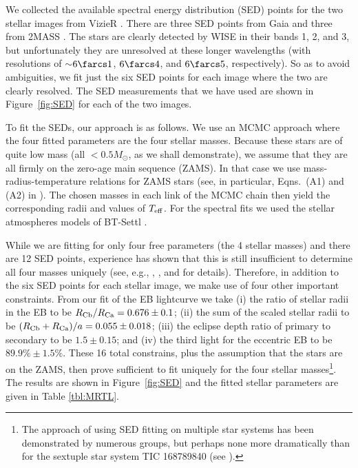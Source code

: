 \documentclass[fleqn,usenatbib]{mnras} %
\begin{document}
We collected the available spectral energy distribution (SED) points for the two stellar images from VizieR \citep[][]{vizier}.  There are three SED points from Gaia \citep[][]{GaiaEDR3} and three from 2MASS \citep[][]{Cutri2003}.  The stars are clearly detected by WISE \citep[][]{Cutri2013} in their bands 1, 2, and 3, but unfortunately they are unresolved at these longer wavelengths (with resolutions of $\sim$$6\farcs1$, $6\farcs4$, and $6\farcs5$, respectively). So as to avoid ambiguities, we fit just the six SED points for each image where the two are clearly resolved. The SED measurements that we have used are shown in Figure~\ref{fig:SED} for each of the two images.

To fit the SEDs, our approach is as follows.  We use an MCMC approach where the four fitted parameters are the four stellar masses.  Because these stars are of quite low mass (all $< 0.5 M_\odot$, as we shall demonstrate), we assume that they are all firmly on the zero-age main sequence (ZAMS).  In that case we use mass-radius-temperature relations for ZAMS stars (see, in particular, Eqns.~(A1) and (A2) in \citealt{Rappaport2017}). The chosen masses in each link of the MCMC chain then yield the corresponding radii and values of $T_{\rm eff}$. For the spectral fits we used the stellar atmospheres models of BT-Settl \citep[][]{Allard2012}.

While we are fitting for only four free parameters (the 4 stellar masses) and there are 12 SED points, experience has shown that this is still insufficient to determine all four masses uniquely (see, e.g., \citealt{Powell2021}, \citealt{borkovits2021}, and \citealt{Kostov2021} for details). Therefore, in addition to the six SED points for each stellar image, we make use of four other important constraints.  From our fit of the EB lightcurve we take (i) the ratio of stellar radii in the EB to be $R_{\rm Cb}/R_{\rm Ca} = 0.676 \pm 0.1$; (ii) the sum of the scaled stellar radii to be  $(R_{\rm Cb}+R_{\rm Ca})/a = 0.055 \pm 0.018$; (iii) the eclipse depth ratio of primary to secondary to be $1.5 \pm 0.15$; and (iv) the third light for the eccentric EB to be $89.9\% \pm 1.5\%$.  These 16 total constrains, plus the assumption that the stars are on the ZAMS, then prove sufficient to fit uniquely for the four stellar masses\footnote{The approach of using SED fitting on multiple star systems has been demonstrated by numerous groups, but perhaps none more dramatically than for the sextuple star system TIC 168789840 (see \citealt{Powell2021}).}. The results are shown in Figure~\ref{fig:SED} and the fitted stellar parameters are given in Table \ref{tbl:MRTL}.
\end{document}
